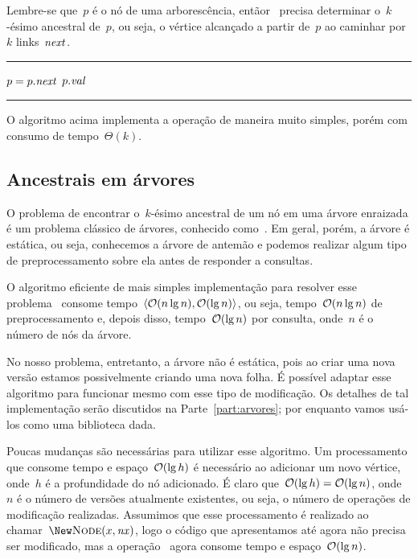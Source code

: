 \documentclass[../../main.tex]{subfiles}
\begin{document}
Lembre-se que~$p$ é o nó de uma arborescência, entãor~ precisa determinar o~$k$-ésimo ancestral de~$p$, ou seja, o vértice alcançado a partir de~$p$ ao caminhar por~$k$ links~$\mathit{next}$. \\

\hrule
\begin{algorithmic}[1]
        \State $p = p.\mathit{next}$
    \EndFor
    \State \Return $p.\mathit{val}$
\EndFunction
\end{algorithmic}
\hrule
\vspace{1em}

O algoritmo acima implementa a operação de maneira muito simples, porém com consumo de tempo~$\Theta(k)$.

\subsection{Ancestrais em árvores}


O problema de encontrar o~$k$-ésimo ancestral de um nó em uma árvore enraizada é um problema clássico de árvores, conhecido como~. Em geral, porém, a árvore é estática, ou seja, conhecemos a árvore de antemão e podemos realizar algum tipo de preprocessamento sobre ela antes de responder a consultas.

O algoritmo eficiente de mais simples implementação para resolver esse problema~\cite{BenderM-F2004} consome tempo~${\langle\mathcal{O}(n \lg n), \mathcal{O}(\lg n)\rangle}$, ou seja, tempo~$\mathcal{O}(n \lg n)$ de preprocessamento e, depois disso, tempo~$\mathcal{O}(\lg n)$ por consulta, onde~$n$ é o número de nós da árvore.

No nosso problema, entretanto, a árvore não é estática, pois ao criar uma nova versão estamos possivelmente criando uma nova folha. É possível adaptar esse algoritmo para funcionar mesmo com esse tipo de modificação. Os detalhes de tal implementação serão discutidos na Parte~\ref{part:arvores}; por enquanto vamos usá-los como uma biblioteca dada.

Poucas mudanças são necessárias para utilizar esse algoritmo. Um processamento que consome tempo e espaço~$\mathcal{O}(\lg h)$ é necessário ao adicionar um novo vértice, onde~$h$ é a profundidade do nó adicionado. É claro que~$\mathcal{O}(\lg h) = \mathcal{O}(\lg n)$, onde~$n$ é o número de versões atualmente existentes, ou seja, o número de operações de modificação realizadas. Assumimos que esse processamento é realizado ao chamar~$\New \Call{Node}{x, \V{nx}}$, logo o código que apresentamos até agora não precisa ser modificado, mas a operação~ agora consome tempo e espaço~$\mathcal{O}(\lg n)$.
\end{document}
